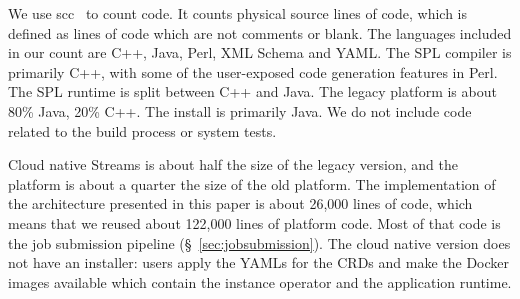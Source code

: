 We use scc~\cite{scc} to count code. It counts physical source lines of code,
which is defined as lines of code which are not comments or blank. The
languages included in our count are C++, Java, Perl, XML Schema and YAML.  The
SPL compiler is primarily C++, with some of the user-exposed code generation
features in Perl.  The SPL runtime is split between C++ and Java. The legacy
platform is about 80\% Java, 20\% C++. The install is primarily Java.  We do
not include code related to the build process or system tests.

Cloud native Streams is about half the size of the legacy version, and the
platform is about a quarter the size of the old platform. The implementation of
the architecture presented in this paper is about 26,000 lines of code, which
means that we reused about 122,000 lines of platform code. Most of that code is
the job submission pipeline (\S~\ref{sec:jobsubmission}). The cloud native
version does not have an installer: users apply the YAMLs for the CRDs and make
the Docker images available which contain the instance operator and the
application runtime.

